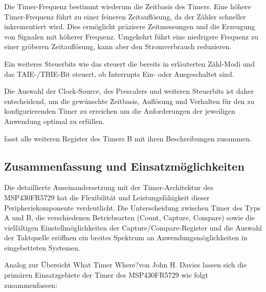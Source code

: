 Die Timer-Frequenz bestimmt wiederum die Zeitbasis des Timers. Eine h\"ohere Timer-Frequenz f\"uhrt zu einer feineren Zeitaufl\"osung, da der Z\"ahler schneller inkrementiert wird. Dies erm\"oglicht pr\"azisere Zeitmessungen und die Erzeugung von Signalen mit h\"oherer Frequenz. Umgekehrt f\"uhrt eine niedrigere Frequenz zu einer gr\"oberen Zeitaufl\"osung, kann aber den Stromverbrauch reduzieren.

Ein weiteres Steuerbits wie das  steuert die bereits in  erl\"auterten Z\"ahl-Modi und das TAIE-/TBIE-Bit steuert, ob Interrupts Ein- oder Ausgeschaltet sind.

Die Auswahl der Clock-Source, des Prescalers und weiteren Steuerbits ist daher entscheidend, um die gew\"unschte Zeitbasis, Aufl\"osung und Verhalten f\"ur den zu konfigurierenden Timer zu erreichen um die Anforderungen der jeweiligen Anwendung optimal zu erf\"ullen.

 fasst alle weiteren Register des Timers B mit ihren Beschreibungen zusammen. \AI

\subsection{Zusammenfassung und Einsatzm\"oglichkeiten}
\label{sec:TimerEinsatzmoeglichkeiten}

Die detaillierte Auseinandersetzung mit der Timer-Architektur des MSP430FR5729 hat die Flexibilit\"at und Leistungsf\"ahigkeit dieser Peripheriekomponente verdeutlicht. Die Unterscheidung zwischen Timer des Typs A und B, die verschiedenen Betriebsarten (Count, Capture, Compare) sowie die vielf\"altigen Einstellm\"oglichkeiten der Capture/Compare-Register und die Auswahl der Taktquelle er\"offnen ein breites Spektrum an Anwendungsm\"oglichkeiten in eingebetteten Systemen.

Analog zur \"Ubersicht \grqq What Timer Where?\grqq von John H. Davies lassen sich die prim\"aren Einsatzgebiete der Timer des MSP430FR5729 wie folgt zusammenfassen: 

